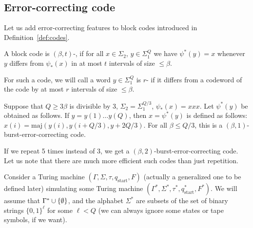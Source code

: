 \documentclass[12pt]{memoir}
\renewcommand{\le}{\leq}
\renewcommand{\ge}{\geq}
\newcommand{\fld}[1]{\ensuremath{\textit{#1\/}}}
\newcommand{\maj}{\mathrm{maj}}
\def\B{B}
\newcommand{\Q}{Q}
\newcommand{\Tu}{T}
\newcommand{\Tus}{T^{*}}
\newcommand{\cDir}{\fld{cDir}}
\newcommand{\NonAdj}{\fld{NonAdj}}
\newcommand{\start}{\mathrm{start}}
\begin{document}
\subsection{Error-correcting code}\label{sec:coding}

Let us add error-correcting features to block codes introduced in
Definition~\ref{def:codes}.

\begin{sloppypar}
\begin{definition}\label{def:err-code}
A block code is \( (\beta,t) \)-,
if for all \( x\in\Sigma_{2} \), \( y\in\Sigma_{1}^{\Q} \) we
have \( \psi^{*}(y)=x \) whenever \( y \) differs from
\( \psi_{*}(x) \) in at most \( t \) intervals of size \( \le\beta \).

For such a code, we will call a word \( y\in\Sigma_{1}^{\Q} \) is \( r \)-
if it differs from a codeword of the code by at most \( r \) intervals of size \( \le\beta \).
\end{definition}
  \end{sloppypar}

\begin{example}\label{xmp:tripling}
  Suppose that \( \Q\ge 3\beta \) is divisible by 3,
  \( \Sigma_{2}=\Sigma_{1}^{\Q/3} \), \( \psi_{*}(x)=xxx \).
  Let \( \psi^{*}(y) \) be obtained as follows.
  If \( y=y(1)\dots y(\Q) \), then \( x=\psi^{*}(y) \) is defined as follows:
    \( x(i)=\maj(y(i),y(i+\Q/3),y+2\Q/3) \).
    For all \( \beta\le \Q/3 \), this is a
    \( (\beta,1) \)-burst-error-correcting code.

    If we repeat 5 times instead of 3, we get a \( (\beta,2) \)-burst-error-correcting
    code.
    Let us note that there are much more efficient such codes than just repetition.
 \end{example}

Consider a Turing machine 
\( (\Gamma, \Sigma,\tau, q_{\start},F) \) (actually a generalized one to be defined later)
simulating some Turing machine \( (\Gamma^{*}, \Sigma^{*},\tau^{*}, q^{*}_{\start},F^{*}) \).
We will assume that \( \Gamma^{*}\cup\mathopen\{\emptyset\mathclose\} \),
and the alphabet \( \Sigma^{*} \) are subsets of the set of  binary strings
\( \{0,1\}^{\ell} \) for some \( \ell<\Q \) (we can always ignore some states or tape
symbols, if we want).
\end{document}
